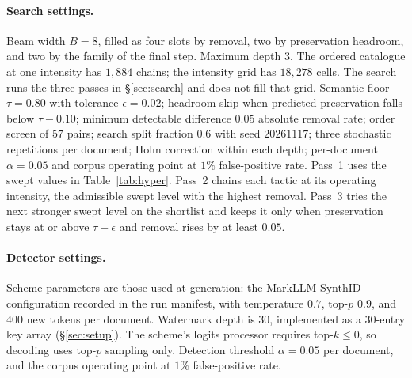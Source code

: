 \paragraph{Search settings.}
Beam width $B = 8$, filled as four slots by removal, two by preservation headroom, and two by the family of the final step. Maximum depth $3$. The ordered catalogue at one intensity has $1{,}884$ chains; the intensity grid has $18{,}278$ cells. The search runs the three passes in \S\ref{sec:search} and does not fill that grid. Semantic floor $\tau = 0.80$ with tolerance $\epsilon = 0.02$; headroom skip when predicted preservation falls below $\tau - 0.10$; minimum detectable difference $0.05$ absolute removal rate; order screen of $57$ pairs; search split fraction $0.6$ with seed $20261117$; three stochastic repetitions per document; Holm correction within each depth; per-document $\alpha = 0.05$ and corpus operating point at $1\%$ false-positive rate. Pass~1 uses the swept values in Table~\ref{tab:hyper}. Pass~2 chains each tactic at its operating intensity, the admissible swept level with the highest removal. Pass~3 tries the next stronger swept level on the shortlist and keeps it only when preservation stays at or above $\tau - \epsilon$ and removal rises by at least $0.05$.

\paragraph{Detector settings.}
Scheme parameters are those used at generation: the MarkLLM SynthID configuration recorded in the run manifest, with temperature $0.7$, top-$p$ $0.9$, and $400$ new tokens per document. Watermark depth is 30, implemented as a 30-entry key array (\S\ref{sec:setup}). The scheme's logits processor requires top-$k \le 0$, so decoding uses top-$p$ sampling only. Detection threshold $\alpha = 0.05$ per document, and the corpus operating point at $1\%$ false-positive rate.
